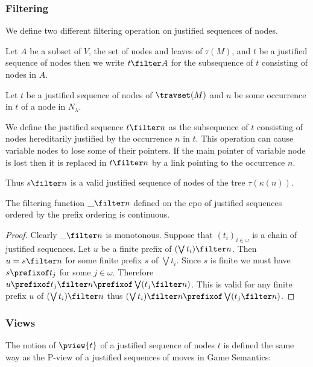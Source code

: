 \subsubsection{Filtering}

We define two different filtering operation on justified sequences of nodes.

Let $A$ be a subset of $V$, the set of nodes and leaves of $\tau(M)$, and $t$ be a justified sequence of nodes then we write $t\filter A$ for the subsequence of $t$ consisting of nodes in $A$.

\begin{definition}
Let $t$ be a justified sequence of nodes of $\travset(M)$ and
$n$ be some occurrence in $t$ of a node in $N_\lambda$.

We define the justified sequence $t \filter n$ as the subsequence of $t$ consisting of nodes hereditarily justified by the occurrence $n$ in $t$.
This operation can cause variable nodes to lose some of their pointers. If the main pointer of variable node is
lost then it is replaced in $t\filter n$ by a link pointing to the occurrence $n$.
\end{definition}
Thus $s \filter n$ is a valid justified sequence of nodes of the tree $\tau(\kappa(n))$.

\begin{lemma}
\label{lem:filtercontinous}
The filtering function $\_ \filter n$ defined on the cpo of justified sequences ordered by the prefix ordering is continuous.
\end{lemma}
\begin{proof}
Clearly $\_ \filter n$ is monotonous.
Suppose that $(t_i)_{i\in\omega}$ is a chain of justified sequences. Let $u$ be a finite prefix of $(\bigvee t_i) \filter n$.
Then $u = s \filter n$ for some finite prefix $s$ of $\bigvee t_i$. Since $s$ is finite we must have $s \prefixof t_j$ for some $j\in\omega$.
Therefore $u \prefixof t_j \filter n \prefixof \bigvee (t_j \filter  n)$.
This is valid for any finite prefix $u$ of $(\bigvee t_i) \filter n$ thus $(\bigvee t_i) \filter  n \prefixof \bigvee (t_j \filter n)$.
\end{proof}

\subsubsection{Views}
The notion of  $\pview{t}$ of a justified sequence
of nodes $t$ is defined the same way as the P-view of a justified
sequences of moves in Game Semantics:

